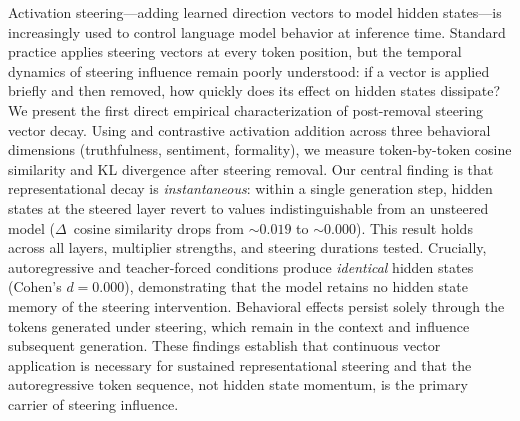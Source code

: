 Activation steering---adding learned direction vectors to model hidden states---is
increasingly used to control language model behavior at inference time. Standard
practice applies steering vectors at every token position, but the temporal
dynamics of steering influence remain poorly understood: if a vector is applied
briefly and then removed, how quickly does its effect on hidden states dissipate?
We present the first direct empirical characterization of post-removal steering
vector decay. Using \gptxl and contrastive activation addition across three
behavioral dimensions (truthfulness, sentiment, formality), we measure
token-by-token cosine similarity and KL divergence after steering removal.
Our central finding is that representational decay is \emph{instantaneous}:
within a single generation step, hidden states at the steered layer revert
to values indistinguishable from an unsteered model ($\Delta$~cosine similarity
drops from ${\sim}0.019$ to ${\sim}0.000$). This result holds across all layers,
multiplier strengths, and steering durations tested. Crucially, autoregressive
and teacher-forced conditions produce \emph{identical} hidden states (Cohen's
$d = 0.000$), demonstrating that the model retains no hidden state memory of the
steering intervention. Behavioral effects persist solely through the tokens
generated under steering, which remain in the context and influence subsequent
generation. These findings establish that continuous vector application is
necessary for sustained representational steering and that the autoregressive
token sequence, not hidden state momentum, is the primary carrier of steering
influence.
